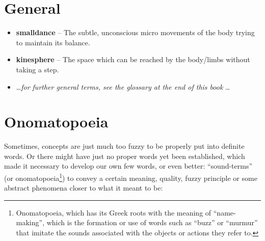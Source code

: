 \section{General}\label{sec:general}

\begin{itemize}
    \item [] \textbf{\Gls{smalldance}} -- The subtle, unconscious micro movements of the body trying to maintain its balance.
    \item [] \textbf{\Gls{kinesphere}} -- The space which can be reached by the body/limbs without taking a step.
    \item [] \ldots \textit{for further general terms, see the glossary at the end of this book} \ldots
\end{itemize}

\section{Onomatopoeia}\label{sec:onomatopoeia}

Sometimes, concepts are just much too fuzzy to be properly put into definite words.
Or there might have just no proper words yet been established, which made it necessary to develop our own few words, or even better: ``sound-terms'' (or onomatopoeia\footnote{Onomatopoeia, which has its Greek roots with the meaning of ``name-making'', which is the formation or use of words such as ``buzz'' or ``murmur'' that imitate the sounds associated with the objects or actions they refer to.}) to convey a certain meaning, quality, fuzzy principle or some abstract phenomena closer to what it meant to be:

